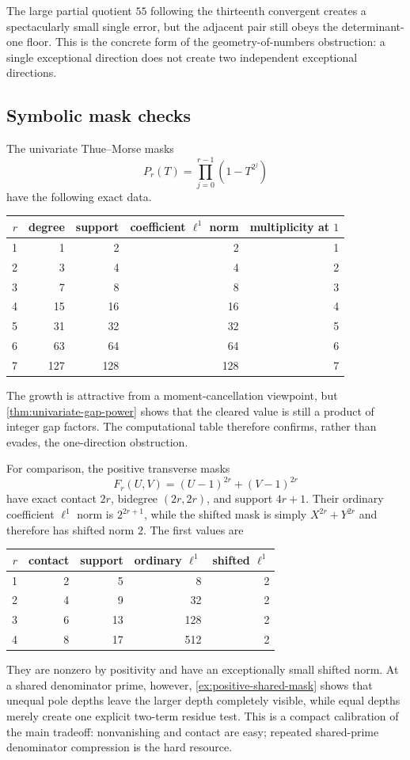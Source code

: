 \documentclass[11pt,oneside]{article}
\theoremstyle{definition}
\theoremstyle{remark}
\begin{document}
The large partial quotient $55$ following the thirteenth convergent creates a spectacularly
small single error, but the adjacent pair still obeys the determinant-one floor.  This is the
concrete form of the geometry-of-numbers obstruction: a single exceptional direction does not
create two independent exceptional directions.

\subsection{Symbolic mask checks}

The univariate Thue--Morse masks
\[
 P_r(T)=\prod_{j=0}^{r-1}(1-T^{2^j})
\]
have the following exact data.

\begin{center}
\small
\begin{tabular}{r r r r r}
\toprule
$r$ & degree & support & coefficient $\ell^1$ norm & multiplicity at $1$ \\
\midrule
1&1&2&2&1\\
2&3&4&4&2\\
3&7&8&8&3\\
4&15&16&16&4\\
5&31&32&32&5\\
6&63&64&64&6\\
7&127&128&128&7\\
\bottomrule
\end{tabular}
\end{center}

The growth is attractive from a moment-cancellation viewpoint, but
\cref{thm:univariate-gap-power} shows that the cleared value is still a product of
integer gap factors.  The computational table therefore confirms, rather than evades, the
one-direction obstruction.

For comparison, the positive transverse masks
\begin{equation}
 F_r(U,V)=(U-1)^{2r}+(V-1)^{2r}
 \label{eq:positive-transverse-mask}
\end{equation}
have exact contact $2r$, bidegree $(2r,2r)$, and support $4r+1$.  Their ordinary
coefficient $\ell^1$ norm is $2^{2r+1}$, while the shifted mask is simply
$X^{2r}+Y^{2r}$ and therefore has shifted norm $2$.  The first values are
\begin{center}
\small
\begin{tabular}{r r r r r}
\toprule
$r$ & contact & support & ordinary $\ell^1$ & shifted $\ell^1$ \\
\midrule
1&2&5&8&2\\
2&4&9&32&2\\
3&6&13&128&2\\
4&8&17&512&2\\
\bottomrule
\end{tabular}
\end{center}
They are nonzero by positivity and have an exceptionally small shifted norm.  At a shared
denominator prime, however, \cref{ex:positive-shared-mask} shows that unequal pole depths leave
the larger depth completely visible, while equal depths merely create one explicit two-term
residue test.  This is a compact calibration of the main tradeoff: nonvanishing and contact
are easy; repeated shared-prime denominator compression is the hard resource.
\end{document}
